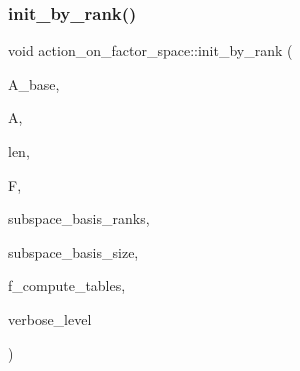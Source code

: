 \mbox{\label{classaction__on__factor__space_a5ef5176e6858a3fbc4336a242ba9b1b4}} 
\subsubsection{\texorpdfstring{init\+\_\+by\+\_\+rank()}{init\_by\_rank()}}
{\footnotesize\ttfamily void action\+\_\+on\+\_\+factor\+\_\+space\+::init\+\_\+by\+\_\+rank (\begin{DoxyParamCaption}\item[{\mbox{\hyperlink{classaction}{action}} \&}]{A\+\_\+base,  }\item[{\mbox{\hyperlink{classaction}{action}} \&}]{A,  }\item[{\mbox{\hyperlink{galois_8h_a09fddde158a3a20bd2dcadb609de11dc}{I\+NT}}}]{len,  }\item[{\mbox{\hyperlink{classfinite__field}{finite\+\_\+field}} $\ast$}]{F,  }\item[{\mbox{\hyperlink{galois_8h_a09fddde158a3a20bd2dcadb609de11dc}{I\+NT}} $\ast$}]{subspace\+\_\+basis\+\_\+ranks,  }\item[{\mbox{\hyperlink{galois_8h_a09fddde158a3a20bd2dcadb609de11dc}{I\+NT}}}]{subspace\+\_\+basis\+\_\+size,  }\item[{\mbox{\hyperlink{galois_8h_a09fddde158a3a20bd2dcadb609de11dc}{I\+NT}}}]{f\+\_\+compute\+\_\+tables,  }\item[{\mbox{\hyperlink{galois_8h_a09fddde158a3a20bd2dcadb609de11dc}{I\+NT}}}]{verbose\+\_\+level }\end{DoxyParamCaption})}

\mbox{\label{classaction__on__factor__space_a646e085b55e8160d943415c0238b5906}} 
